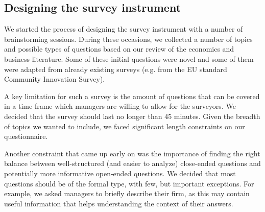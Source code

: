\documentclass[final, dvipsnames, authoryear,12pt]{elsarticle}
\begin{document}


\subsection{Designing the survey instrument}
\label{sec:intrument}


We started the process of designing the survey instrument with a number of brainstorming sessions. During these occasions, we collected a number of topics and possible types of questions based on our review of the economics and business literature. Some of these initial questions were novel and some of them were adapted from already existing surveys (e.g. from the EU standard Community Innovation Survey). 

A key limitation for such a survey is the amount of questions that can be covered in a time frame which managers are willing to allow for the surveyors. We decided that the survey should last no longer than 45 minutes. Given the breadth of topics we wanted to include, we faced significant length constraints on our questionnaire. 

Another constraint that came up early on was the  importance of finding the right balance between  well-structured (and easier to analyze) close-ended questions and potentially more informative open-ended questions. We decided that most questions should be of the formal type, with few, but important exceptions. For example, we asked managers to briefly describe their firm, as this may contain useful information that helps understanding the context of their answers. 


\end{document}
